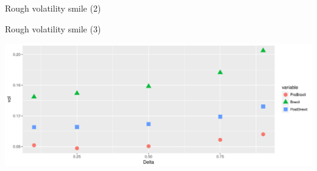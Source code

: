 \begin{frame}[fragile]{Rough volatility smile (2)}

\begin{Shaded}
\begin{Highlighting}[]
\StringTok{ }\NormalTok{)}
\NormalTok{(}\NormalTok{(}\OperatorTok{+}
\StringTok{   }\NormalTok{(}\NormalTok{(}\NormalTok{) }\OperatorTok{+}
\StringTok{   }\NormalTok{(}\NormalTok{)}
\end{Highlighting}
\end{Shaded}

\end{frame}

\begin{frame}{Rough volatility smile (3)}

\includegraphics[width=1\linewidth]{2018_02_07_IMF_FXCourse_files/figure-beamer/unnamed-chunk-33-1}

\end{frame}

